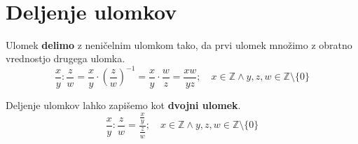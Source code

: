             ~

        \section{Deljenje ulomkov}

        
                Ulomek \textbf{delimo} z neničelnim ulomkom tako, da prvi ulomek množimo z obratno vrednostjo drugega ulomka.
                $$\dfrac{x}{y}:\dfrac{z}{w}=\dfrac{x}{y}\cdot\left(\dfrac{z}{w}\right)^{-1}=\dfrac{x}{y}\cdot\dfrac{w}{z}=\dfrac{xw}{yz}; \quad x\in\mathbb{Z}\land y,z,w\in\mathbb{Z}\setminus\{0\} $$
            

            
                Deljenje ulomkov lahko zapišemo kot \textbf{dvojni ulomek}.
                $$\dfrac{x}{y}:\dfrac{z}{w}=\dfrac{\frac{x}{y}}{\frac{z}{w}}; \quad x\in\mathbb{Z}\land y,z,w\in\mathbb{Z}\setminus\{0\} $$
            

                ~
        



